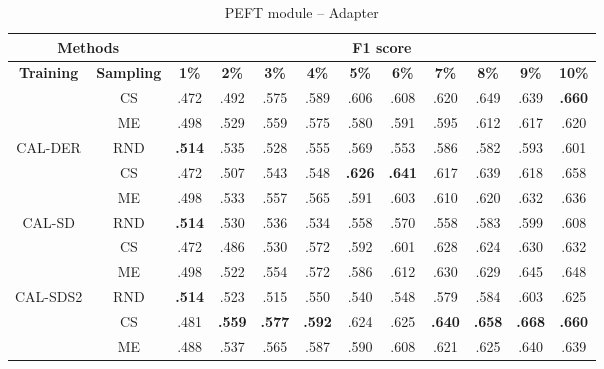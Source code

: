 \begin{table}[htbp]
\centering
\begin{subtable}{\linewidth}
\centering
\caption{PEFT module -- Adapter}

\begin{tabular}{c|c|cccccccccc}
\toprule
\multicolumn{2}{c|}{\textbf{Methods}} & \multicolumn{10}{c}{\textbf{F1 score}} \\
\midrule
\textbf{Training} & \textbf{Sampling} & \textbf{1\%} & \textbf{2\%} & \textbf{3\%} & \textbf{4\%} & \textbf{5\%} & \textbf{6\%} & \textbf{7\%} & \textbf{8\%} & \textbf{9\%} & \textbf{10\%}\\
\midrule
 & CS & .472 & .492 & .575 & .589 & .606 & .608 & .620 & .649 & .639 & \textbf{.660}\\

 & ME & .498 & .529 & .559 & .575 & .580 & .591 & .595 & .612 & .617 & .620\\

\multirow{-3}{*}{\raggedright\arraybackslash CAL-DER} & RND & \textbf{.514} & .535 & .528 & .555 & .569 & .553 & .586 & .582 & .593 & .601\\
\midrule
 & CS & .472 & .507 & .543 & .548 & \textbf{.626} & \textbf{.641} & .617 & .639 & .618 & .658\\

 & ME & .498 & .533 & .557 & .565 & .591 & .603 & .610 & .620 & .632 & .636\\

\multirow{-3}{*}{\raggedright\arraybackslash CAL-SD} & RND & \textbf{.514} & .530 & .536 & .534 & .558 & .570 & .558 & .583 & .599 & .608\\
\midrule
 & CS & .472 & .486 & .530 & .572 & .592 & .601 & .628 & .624 & .630 & .632\\

 & ME & .498 & .522 & .554 & .572 & .586 & .612 & .630 & .629 & .645 & .648\\

\multirow{-3}{*}{\raggedright\arraybackslash CAL-SDS2} & RND & \textbf{.514} & .523 & .515 & .550 & .540 & .548 & .579 & .584 & .603 & .625\\
\midrule
 & CS & .481 & \textbf{.559} & \textbf{.577} & \textbf{.592} & .624 & .625 & \textbf{.640} & \textbf{.658} & \textbf{.668} & \textbf{.660}\\

 & ME & .488 & .537 & .565 & .587 & .590 & .608 & .621 & .625 & .640 & .639\\


\end{tabular}
\end{subtable}
\end{table}
